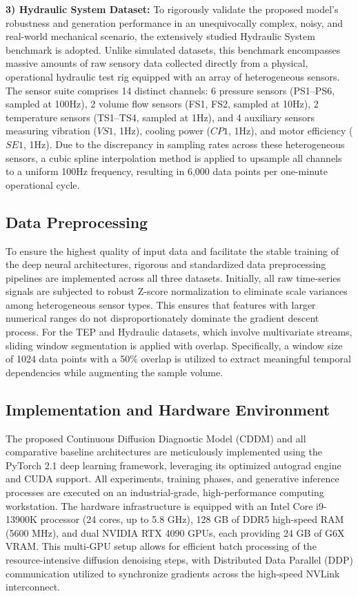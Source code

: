 \textbf{3) Hydraulic System Dataset:} To rigorously validate the proposed model's robustness and generation performance in an unequivocally complex, noisy, and real-world mechanical scenario, the extensively studied Hydraulic System benchmark is adopted. Unlike simulated datasets, this benchmark encompasses massive amounts of raw sensory data collected directly from a physical, operational hydraulic test rig equipped with an array of heterogeneous sensors. The sensor suite comprises 14 distinct channels: 6 pressure sensors (PS1--PS6, sampled at 100Hz), 2 volume flow sensors (FS1, FS2, sampled at 10Hz), 2 temperature sensors (TS1--TS4, sampled at 1Hz), and 4 auxiliary sensors measuring vibration ($VS1$, 1Hz), cooling power ($CP1$, 1Hz), and motor efficiency ($SE1$, 1Hz). Due to the discrepancy in sampling rates across these heterogeneous sensors, a cubic spline interpolation method is applied to upsample all channels to a uniform 100Hz frequency, resulting in 6,000 data points per one-minute operational cycle.

\subsection{Data Preprocessing}
To ensure the highest quality of input data and facilitate the stable training of the deep neural architectures, rigorous and standardized data preprocessing pipelines are implemented across all three datasets. Initially, all raw time-series signals are subjected to robust Z-score normalization to eliminate scale variances among heterogeneous sensor types. This ensures that features with larger numerical ranges do not disproportionately dominate the gradient descent process. For the TEP and Hydraulic datasets, which involve multivariate streams, sliding window segmentation is applied with overlap. Specifically, a window size of 1024 data points with a 50\% overlap is utilized to extract meaningful temporal dependencies while augmenting the sample volume.

\subsection{Implementation and Hardware Environment}
The proposed Continuous Diffusion Diagnostic Model (CDDM) and all comparative baseline architectures are meticulously implemented using the PyTorch 2.1 deep learning framework, leveraging its optimized autograd engine and CUDA support. All experiments, training phases, and generative inference processes are executed on an industrial-grade, high-performance computing workstation. The hardware infrastructure is equipped with an Intel Core i9-13900K processor (24 cores, up to 5.8 GHz), 128 GB of DDR5 high-speed RAM (5600 MHz), and dual NVIDIA RTX 4090 GPUs, each providing 24 GB of G6X VRAM. This multi-GPU setup allows for efficient batch processing of the resource-intensive diffusion denoising steps, with Distributed Data Parallel (DDP) communication utilized to synchronize gradients across the high-speed NVLink interconnect.

